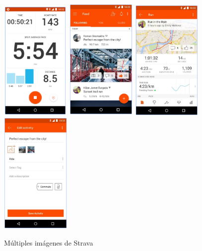 \documentclass[a4paper, 11pt]{article}
\begin{document}
                    \begin{figure}[H]
                        \centering
                        \includegraphics[width=0.3\textwidth]{strava1}
                        \includegraphics[width=0.3\textwidth]{strava2}
                        \includegraphics[width=0.3\textwidth]{strava3}
                        \includegraphics[width=0.3\textwidth]{strava4}
                          \caption{Múltiples imágenes de Strava}
                          \label{f:strava}
                      \end{figure}
\end{document}
